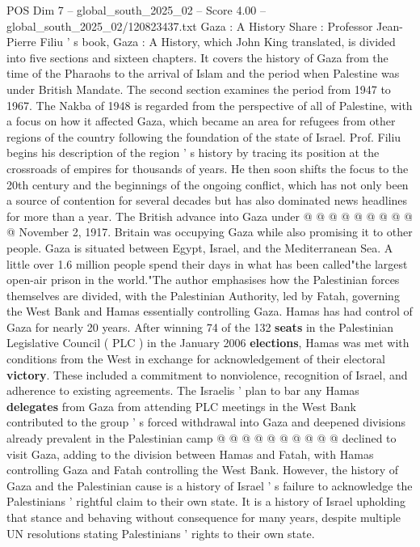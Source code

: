 \begin{textsample}{POS Dim 7 – global\_south\_2025\_02 – Score 4.00 – global\_south\_2025\_02/120823437.txt}  \label{ex:f7_pos_418}
Gaza : A History Share : Professor Jean-Pierre Filiu ' s book, Gaza : A History, which John King translated, is divided into five sections and sixteen chapters.
It covers the history of Gaza from the time of the Pharaohs to the arrival of Islam and the period when Palestine was under British Mandate.
The second section examines the period from 1947 to 1967.
The Nakba of 1948 is regarded from the perspective of all of Palestine, with a focus on how it affected Gaza, which became an area for refugees from other regions of the country following the foundation of the state of Israel.
Prof.
Filiu begins his description of the region ' s history by tracing its position at the crossroads of empires for thousands of years.
He then soon shifts the focus to the 20th century and the beginnings of the ongoing conflict, which has not only been a source of contention for several decades but has also dominated news headlines for more than a year.
The British advance into Gaza under @ @ @ @ @ @ @ @ @ @ November 2, 1917.
Britain was occupying Gaza while also promising it to other people.
Gaza is situated between Egypt, Israel, and the Mediterranean Sea.
A little over 1.6 million people spend their days in what has been called"the largest open-air prison in the world."The author emphasises how the Palestinian forces themselves are divided, with the Palestinian Authority, led by Fatah, governing the West Bank and Hamas essentially controlling Gaza.
Hamas has had control of Gaza for nearly 20 years.
After winning 74 of the 132 \textbf{seats} in the Palestinian Legislative Council ( PLC ) in the January 2006 \textbf{elections}, Hamas was met with conditions from the West in exchange for acknowledgement of their electoral \textbf{victory}.
These included a commitment to nonviolence, recognition of Israel, and adherence to existing agreements.
The Israelis ' plan to bar any Hamas \textbf{delegates} from Gaza from attending PLC meetings in the West Bank contributed to the group ' s forced withdrawal into Gaza and deepened divisions already prevalent in the Palestinian camp @ @ @ @ @ @ @ @ @ @ declined to visit Gaza, adding to the division between Hamas and Fatah, with Hamas controlling Gaza and Fatah controlling the West Bank.
However, the history of Gaza and the Palestinian cause is a history of Israel ' s failure to acknowledge the Palestinians ' rightful claim to their own state.
It is a history of Israel upholding that stance and behaving without consequence for many years, despite multiple UN resolutions stating Palestinians ' rights to their own state.

\end{textsample}
